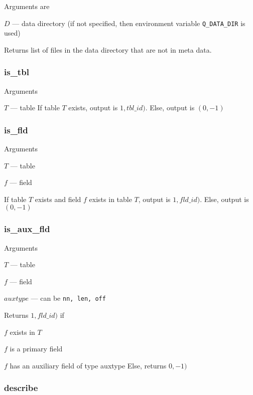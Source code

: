 Arguments are
\be
\item \(D\) --- data directory (if not specified, then environment
    variable \verb+Q_DATA_DIR+ is used)
\ee

Returns list of files in the data directory that are not in meta data. 

\subsubsection{is\_tbl}
\label{is_tbl}
Arguments 
\be
\item \(T\) --- table
\ee
If table \(T\) exists, output is \(1, tbl\_id)\). Else, 
output is \((0, -1)\)

\subsubsection{is\_fld}
\label{is_fld}
Arguments 
\be
\item \(T\) --- table
\item \(f\) --- field
\ee

If table \(T\) exists and field \(f\) exists in table \(T\), 
output is \(1, fld\_id)\). Else, output is \((0, -1)\)

\subsubsection{is\_aux\_fld}
\label{is_aux_fld}
Arguments 
\be
\item \(T\) --- table
\item \(f\) --- field
\item \(auxtype\) --- can be {\tt nn, len, off}
\ee

Returns \(1, fld\_id)\) if 
\be
\item \(f\) exists in \(T\) 
\item \(f\) is a primary field 
\item \(f\) has an auxiliary field of type auxtype
\ee
Else, returns \(0, -1)\)

\subsubsection{describe}
\label{describe}

